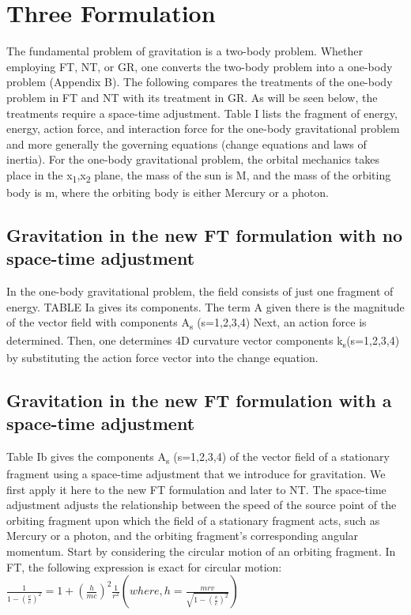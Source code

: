 \documentclass[12pt]{article}
\begin{document}
\section{Three Formulation}
The fundamental problem of gravitation is a two-body
problem. Whether employing FT, NT, or GR, one
converts the two-body problem into a one-body problem
(Appendix B). The following compares the treatments of the
one-body problem in FT and NT with its treatment in GR.
As will be seen below, the treatments require a space-time
adjustment. Table I lists the fragment of energy, energy,
action force, and interaction force for the one-body gravitational problem and more generally the governing equations
(change equations and laws of inertia). For the one-body
gravitational problem, the orbital mechanics takes place in
the x\textsubscript{1},x\textsubscript{2} plane, the mass of the sun is M, and the mass of the
orbiting body is m, where the orbiting body is either Mercury
or a photon.
\subsection{Gravitation in the new FT formulation with no
space-time adjustment}
In the one-body gravitational problem, the field consists
of just one fragment of energy. TABLE Ia gives its components. The term A given there is the magnitude of the vector
field with components A\textsubscript{s} (s=1,2,3,4) Next, an action
force is determined. Then, one determines 4D curvature vector components k\textsubscript{s}(s=1,2,3,4)
by substituting the action
force vector into the change equation.
\subsection{Gravitation in the new FT formulation with a
 space-time adjustment}
 Table Ib gives the components A\textsubscript{s} (s=1,2,3,4) of the
vector field of a stationary fragment using a space-time
adjustment that we introduce for gravitation. We first apply
it here to the new FT formulation and later to NT. The
space-time adjustment adjusts the relationship between the
speed of the source point of the orbiting fragment upon
which the field of a stationary fragment acts, such as
Mercury or a photon, and the orbiting fragment’s corresponding angular momentum. Start by considering the circular motion of an orbiting fragment. In FT, the following
expression is exact for circular motion:
\\
$\frac{1}{1-(\frac{v}{c})^2}=1+(\frac{h}{mc})^2\frac{1}{r^2} (where,  h=\frac{mrv}{\sqrt{1-(\frac{v}{c})^2} })$
\end{document}
